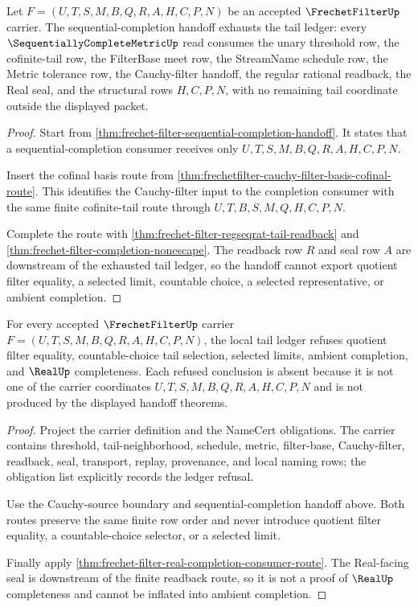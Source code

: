 \begin{theorem}
\label{thm:frechetfilter-sequential-completion-tail-exhaustion}
Let $F=(U,T,S,M,B,Q,R,A,H,C,P,N)$ be an accepted $\FrechetFilterUp$ carrier.
The sequential-completion handoff exhausts the tail ledger: every
$\SequentiallyCompleteMetricUp$ read consumes the unary threshold row, the
cofinite-tail row, the FilterBase meet row, the StreamName schedule row, the
Metric tolerance row, the Cauchy-filter handoff, the regular rational
readback, the Real seal, and the structural rows $H,C,P,N$, with no remaining
tail coordinate outside the displayed packet.
\end{theorem}
\begin{proof}
Start from \autoref{thm:frechet-filter-sequential-completion-handoff}. It
states that a sequential-completion consumer receives only
$U,T,S,M,B,Q,R,A,H,C,P,N$.

Insert the cofinal basis route from
\autoref{thm:frechetfilter-cauchy-filter-basis-cofinal-route}. This identifies
the Cauchy-filter input to the completion consumer with the same finite
cofinite-tail route through $U,T,B,S,M,Q,H,C,P,N$.

Complete the route with \autoref{thm:frechet-filter-regseqrat-tail-readback}
and \autoref{thm:frechet-filter-completion-nonescape}. The readback row $R$
and seal row $A$ are downstream of the exhausted tail ledger, so the handoff
cannot export quotient filter equality, a selected limit, countable choice, a
selected representative, or ambient completion.
\end{proof}

\begin{theorem}
\label{thm:frechet-filter-tail-ledger-refusal}
For every accepted $\FrechetFilterUp$ carrier $F=(U,T,S,M,B,Q,R,A,H,C,P,N)$, the local tail ledger refuses quotient filter equality, countable-choice tail selection, selected limits, ambient completion, and $\RealUp$ completeness. Each refused conclusion is absent because it is not one of the carrier coordinates $U,T,S,M,B,Q,R,A,H,C,P,N$ and is not produced by the displayed handoff theorems.
\end{theorem}
\begin{proof}
Project the carrier definition and the NameCert obligations. The carrier contains threshold, tail-neighborhood, schedule, metric, filter-base, Cauchy-filter, readback, seal, transport, replay, provenance, and local naming rows; the obligation list explicitly records the ledger refusal.

Use the Cauchy-source boundary and sequential-completion handoff above. Both routes preserve the same finite row order and never introduce quotient filter equality, a countable-choice selector, or a selected limit.

Finally apply \autoref{thm:frechet-filter-real-completion-consumer-route}. The Real-facing seal is downstream of the finite readback route, so it is not a proof of $\RealUp$ completeness and cannot be inflated into ambient completion.
\end{proof}

